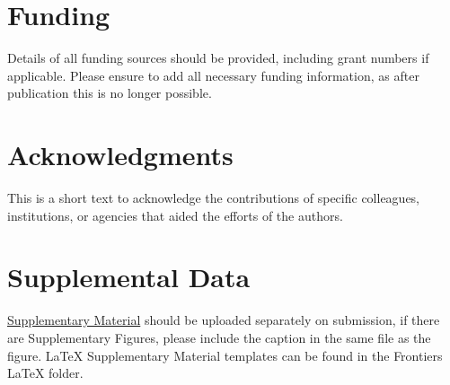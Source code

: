 \documentclass[utf8]{style/FrontiersinHarvard}
\begin{document}
\section*{Funding}
Details of all funding sources should be provided, including grant numbers if applicable.
Please ensure to add all necessary funding information, as after publication this is no longer possible.

\section*{Acknowledgments}
This is a short text to acknowledge the contributions of specific colleagues, institutions, or agencies that aided the efforts of the authors.

\section*{Supplemental Data}
 \href{http://home.frontiersin.org/about/author-guidelines#SupplementaryMaterial}{Supplementary Material} should be uploaded separately on submission, if there are Supplementary Figures, please include the caption in the same file as the figure. LaTeX Supplementary Material templates can be found in the Frontiers LaTeX folder.



\end{document}
